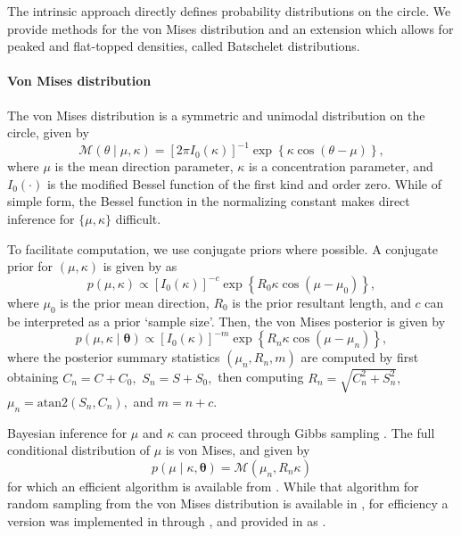 \label{sec:intrinsic}

The intrinsic approach directly defines probability distributions on the
circle. We provide methods for the von Mises distribution and an
extension which allows for peaked and flat-topped densities, called
Batschelet distributions.

\hypertarget{von-mises-distribution}{%
\paragraph{Von Mises distribution}\label{von-mises-distribution}}

\label{vonmisespost}

The von Mises distribution is a symmetric and unimodal distribution on
the circle, given by \begin{equation}
\mathcal{M}(\theta \mid \mu, \kappa) = [2 \pi I_0(\kappa)]^{-1} \exp \left\{ \kappa \cos(\theta - \mu) \right\},
\end{equation} where \(\mu\) is the mean direction parameter, \(\kappa\)
is a concentration parameter, and \(I_0(\cdot)\) is the modified Bessel
function of the first kind and order zero. While of simple form, the
Bessel function in the normalizing constant makes direct inference for
\(\{\mu, \kappa\}\) difficult.

To facilitate computation, we use conjugate priors where possible. A
conjugate prior for \((\mu, \kappa)\) is given by
\citet{guttorp1988finding} as
\begin{equation} \label{eqnjss:vmconjprior}
p(\mu, \kappa) \propto [I_0(\kappa)]^{-c}  \exp \left\{ R_0 \kappa \cos(\mu - \mu_0) \right\},
\end{equation} where \(\mu_0\) is the prior mean direction, \(R_0\) is
the prior resultant length, and \(c\) can be interpreted as a prior
`sample size'. Then, the von Mises posterior is given by
\begin{equation}
p(\mu, \kappa \mid \boldsymbol{\theta}) \propto [I_0(\kappa)]^{-m}  \exp \left\{ R_n \kappa \cos(\mu - \mu_n) \right\},
\end{equation} where the posterior summary statistics
\((\mu_n, R_n, m)\) are computed by first obtaining \(C_n = C + C_0,\)
\(S_n = S + S_0,\) then computing \(R_n = \sqrt{C_n^2 + S_n^2},\)
\(\mu_n = \text{atan2}(S_n, C_n),\) and \(m = n + c\).

Bayesian inference for \(\mu\) and \(\kappa\) can proceed through Gibbs
sampling \citep{chib1995understanding}. The full conditional
distribution of \(\mu\) is von Mises, and given by \begin{equation}
p(\mu \mid \kappa, \boldsymbol{\theta}) = \mathcal{M}(\mu_n, R_n \kappa)
\end{equation} for which an efficient algorithm is available from
\citet{best1981bias}. While that algorithm for random sampling from the
von Mises distribution is available in , for efficiency a
version was implemented in  through 
\citep{rcpp}, and provided in  as .


